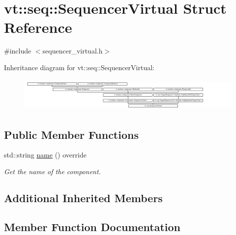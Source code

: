 \hypertarget{structvt_1_1seq_1_1_sequencer_virtual}{}\section{vt\+:\+:seq\+:\+:Sequencer\+Virtual Struct Reference}
\label{structvt_1_1seq_1_1_sequencer_virtual}


{\ttfamily \#include $<$sequencer\+\_\+virtual.\+h$>$}

Inheritance diagram for vt\+:\+:seq\+:\+:Sequencer\+Virtual\+:\begin{figure}[H]
\begin{center}
\leavevmode
\includegraphics[height=1.694915cm]{structvt_1_1seq_1_1_sequencer_virtual}
\end{center}
\end{figure}
\subsection*{Public Member Functions}
\begin{DoxyCompactItemize}
\item 
std\+::string \hyperlink{structvt_1_1seq_1_1_sequencer_virtual_ac51488cfa89d4749b1f5a85f7c2d180c}{name} () override
\begin{DoxyCompactList}\small\item\em Get the name of the component. \end{DoxyCompactList}\end{DoxyCompactItemize}
\subsection*{Additional Inherited Members}


\subsection{Member Function Documentation}
\mbox{\label{structvt_1_1seq_1_1_sequencer_virtual_ac51488cfa89d4749b1f5a85f7c2d180c}} 
